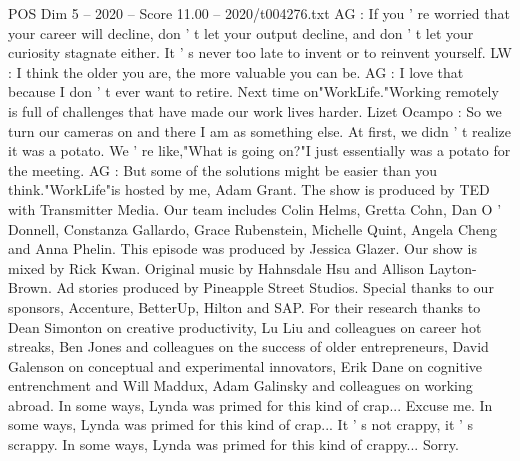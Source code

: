 \begin{textsample}{POS Dim 5 – 2020 – Score 11.00 – 2020/t004276.txt}
AG : If you ' re worried that your career will decline, don ' t let your output decline, and don ' t let your curiosity stagnate either.
It ' s never too late to invent or to reinvent yourself.
LW : I think the older you are, the more valuable you can be.
AG : I love that because I don ' t ever want to retire.
Next time on"WorkLife."Working remotely is full of challenges that have made our work lives harder.
Lizet Ocampo : So we turn our cameras on and there I am as something else.
At first, we didn ' t realize it was a potato.
We ' re like,"What is going on?"I just essentially was a potato for the meeting.
AG : But some of the solutions might be easier than you think."WorkLife"is hosted by me, Adam Grant.
The show is produced by TED with Transmitter Media.
Our team includes Colin Helms, Gretta Cohn, Dan O ' Donnell, Constanza Gallardo, Grace Rubenstein, Michelle Quint, Angela Cheng and Anna Phelin.
This episode was produced by Jessica Glazer.
Our show is mixed by Rick Kwan.
Original music by Hahnsdale Hsu and Allison Layton-Brown.
Ad stories produced by Pineapple Street Studios.
Special thanks to our sponsors, Accenture, BetterUp, Hilton and SAP.
For their research thanks to Dean Simonton on creative productivity, Lu Liu and colleagues on career hot streaks, Ben Jones and colleagues on the success of older entrepreneurs, David Galenson on conceptual and experimental innovators, Erik Dane on cognitive entrenchment and Will Maddux, Adam Galinsky and colleagues on working abroad.
In some ways, Lynda was primed for this kind of crap...
Excuse me.
In some ways, Lynda was primed for this kind of crap...
It ' s not crappy, it ' s scrappy.
In some ways, Lynda was primed for this kind of crappy...
Sorry.

\end{textsample}

